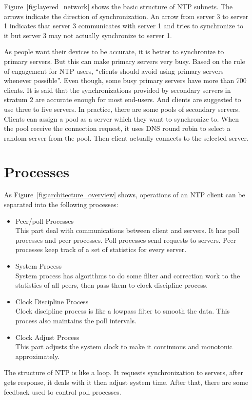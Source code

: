 Figure~\ref{fig:layered_network} shows the basic structure of NTP subnets. The
arrows indicate the direction of synchronization. An arrow from server 3 to
server 1 indicates that server 3 communicates with server 1 and tries to
synchronize to it but server 3 may not actually synchronize to server 1.



As people want their devices to be accurate, it is better to synchronize to
primary servers. But this can make primary servers very busy. Based on the rule
of engagement for NTP users, ``clients should avoid using primary servers
whenever possible''. Even though, some busy primary servers have more than 700
clients. 
It is said that the synchronizations provided by secondary servers in stratum 2
are accurate enough for most end-users. And clients are suggested to use three
to five servers. In practice, there are some pools of secondary servers.
Clients can assign a pool as a server which they want to synchronize to. When
the pool receive the connection request, it uses DNS round robin to select a
random server from the pool. Then client actually connects to the selected
server.

\section{Processes}
\label{sec:processes}
As Figure~\ref{fig:architecture_overview} shows, operations of an NTP client
can be separated into the following processes:
\begin{itemize}
    \item Peer/poll Processes\\
        This part deal with communications between client and servers. It has
        poll processes and peer processes. Poll processes send requests to
        servers. Peer processes keep track of a set of statistics for every
        server.
    \item System Process\\
        System process has algorithms to do some filter and correction work to
        the statistics of all peers, then pass them to clock discipline
        process.
    \item Clock Discipline Process\\
        Clock discipline process is like a lowpass filter to smooth the data.
        This process also maintains the poll intervals.
    \item Clock Adjust Process\\
        This part adjusts the system clock to make it continuous and monotonic
        approximately. 
\end{itemize}
The structure of NTP is like a loop. It requests synchronization to servers, after
gets response, it deals with it then adjust system time. After that, there are some
feedback used to control poll processes.

